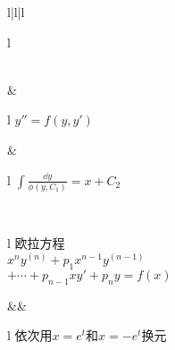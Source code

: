 \begin{table}[!htp]
\begin{tblr}{l|l|l}
\begin{tblr}{l}
			\end{tblr} \\  %
			& \begin{tblr}{l}
				\(y'' = f(y, y')\) \\ %
			\end{tblr}
			& \begin{tblr}{l}
				\(\int \frac{\dd{y}}{\phi(y,C_1)} = x + C_2\) \\ %
			\end{tblr}
		\\ \hline
		\begin{tblr}{l}
			欧拉方程 \\ %
			\(x^n y^{(n)} + p_1 x^{n-1} y^{(n-1)}\) \\
			\(+ \dotsb + p_{n-1} x y' + p_n y = f(x)\) \\
		\end{tblr}
			&& \begin{tblr}{l}
				依次用\(x=e^t\)和\(x=-e^t\)换元 \\
			\end{tblr}
		\\ \hline
	\end{tblr}
\end{table}
